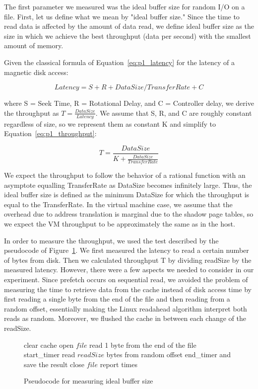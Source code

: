 The first parameter we measured was the ideal buffer size for random I/O 
on a file. First, let us define what we mean by "ideal buffer size." Since
the time to read data is affected by the amount of data read, we define ideal
buffer size as the size in which we achieve the best throughput (data per second)
with the smallest amount of memory. 

Given the classical formula of Equation~\ref{eq:p1_latency} for the latency 
of a magnetic disk access:

\begin{equation}\label{eq:p1_latency}
Latency = S + R + DataSize/TransferRate + C
\end{equation}

where S = Seek Time, R = Rotational Delay, and C = Controller delay, we 
derive the throughput as $T = \frac{DataSize}{Latency}$. We assume that S, R, 
and C are roughly constant regardless of size, so we represent them as constant K and simplify to Equation~\ref{eq:p1_throughput}:

\begin{equation}\label{eq:p1_throughput}
T = \frac{DataSize}{K + \frac{DataSize}{TransferRate}}
\end{equation}

We expect the throughput to follow the behavior of a rational function
with an asymptote equalling TransferRate as DataSize becomes infinitely large.
Thus, the ideal buffer size is defined as the minimum DataSize for which the 
throughput is equal to the TransferRate. In the virtual machine case, we assume 
that the overhead due to address translation is marginal due to the shadow page 
tables, so we expect the VM throughput to be approximately the same as in the host.

In order to measure the throughput, we used the test described by the pseudocode 
of Figure~\ref{fig:p1code}. We first measured the latency to read a
certain number of bytes from disk. Then we calculated throughput T by dividing 
readSize by the measured latency. However, there were a few aspects we needed 
to consider in our experiment. Since prefetch occurs on sequential read, 
we avoided the problem of measuring the time to retrieve data from the cache instead
of disk access time by first reading a single byte from the end of the file
and then reading from a random offset, essentially making the Linux readahead
algorithm interpret both reads as random. Moreover, we flushed the cache in
between each change of the readSize. 

\begin{figure}[h!]
\begin{algorithmic}
   \STATE clear cache
   \STATE open $file$
   \STATE read 1 byte from the end of the file
   \STATE start\_timer
   \STATE read $readSize$ bytes from random offset 
   \STATE end\_timer and save the result
   \STATE close $file$
   \STATE report times
\ENDFOR
\end{algorithmic}
\caption{Pseudocode for measuring ideal buffer size}
\label{fig:p1code}
\end{figure}

